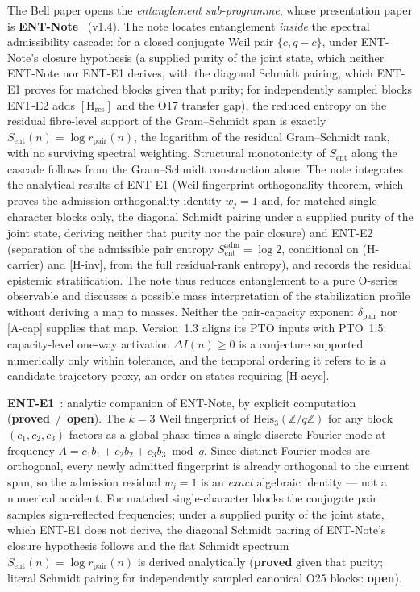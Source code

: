 \documentclass[11pt,a4paper]{article}
\newcommand{\sproved}{\textcolor{cproved}{\textbf{proved}}}
\newcommand{\sopen}{\textcolor{copen}{\textbf{open}}}
\begin{document}
    The Bell paper opens the \emph{entanglement sub-programme}, whose presentation paper is
    \textbf{ENT-Note}~\cite{Beau2026entnote} (v1.4).
    The note locates entanglement \emph{inside} the spectral admissibility cascade: for a closed
    conjugate Weil pair $\{c,q-c\}$, under ENT-Note's closure hypothesis (a supplied purity of the joint
    state, which neither ENT-Note nor ENT-E1 derives, with the diagonal Schmidt pairing, which ENT-E1 proves
    for matched blocks given that purity; for independently sampled blocks ENT-E2 adds
    $[\mathrm{H}_{\mathrm{res}}]$ and the O17 transfer gap), the reduced entropy on the residual fibre-level
    support of the
    Gram--Schmidt span is exactly
    $S_{\mathrm{ent}}(n) = \log r_{\mathrm{pair}}(n)$, the logarithm of the residual Gram--Schmidt
    rank, with no surviving spectral weighting.
    Structural monotonicity of $S_{\mathrm{ent}}$ along the cascade follows from the Gram--Schmidt
    construction alone. The note integrates the analytical results of ENT-E1 (Weil fingerprint
    orthogonality theorem, which proves the admission-orthogonality identity $w_j=1$ and, for matched
    single-character blocks only, the diagonal Schmidt pairing under a supplied purity of the joint state,
    deriving neither that purity nor the pair closure) and ENT-E2 (separation of the admissible pair entropy
    $S_{\mathrm{ent}}^{\mathrm{adm}}=\log 2$, conditional on (H-carrier) and [H-inv], from the full
    residual-rank entropy), and records the residual epistemic stratification. The note thus reduces entanglement to a pure O-series observable and
    discusses a possible mass interpretation of the stabilization profile without deriving a map to masses.
    Neither the pair-capacity exponent $\delta_{\mathrm{pair}}$ nor [A-cap] supplies that map.
    Version~1.3 aligns its PTO inputs with PTO~1.5: capacity-level one-way activation
    $\Delta I(n)\geq 0$ is a conjecture supported numerically only within tolerance, and the temporal
    ordering it refers to is a candidate trajectory proxy, an order on states requiring [H-acyc].

    \textbf{ENT-E1}~\cite{Beau2026ent1}: analytic companion of ENT-Note, by
    explicit computation (\sproved\ /\ \sopen). The $k{=}3$ Weil fingerprint of
    $\mathrm{Heis}_3(\mathbb{Z}/q\mathbb{Z})$
    for any block $(c_1,c_2,c_3)$ factors as a global phase times a single discrete Fourier mode
    at frequency $A = c_1b_1+c_2b_2+c_3b_3 \bmod q$. Since distinct Fourier modes are orthogonal,
    every newly admitted fingerprint is already orthogonal to the current span, so the admission
    residual $w_j=1$ is an \emph{exact} algebraic identity --- not a numerical accident. For
    matched single-character blocks the conjugate pair samples sign-reflected frequencies; under a supplied
    purity of the joint state, which ENT-E1 does not derive, the diagonal Schmidt pairing of ENT-Note's
    closure hypothesis follows and the flat Schmidt spectrum
    $S_{\mathrm{ent}}(n)=\log r_{\mathrm{pair}}(n)$ is derived analytically (\sproved{} given that purity;
    literal Schmidt pairing for independently sampled canonical O25 blocks: \sopen).
\end{document}
